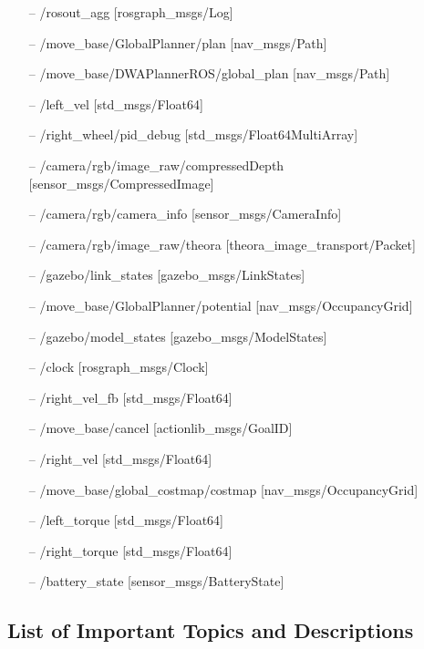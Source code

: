 \documentclass[12]{article}
\begin{document}
\begin{itemize}
\item[--] /rosout\_agg [rosgraph\_msgs/Log]
\item[--] /move\_base/GlobalPlanner/plan [nav\_msgs/Path]
\item[--] /move\_base/DWAPlannerROS/global\_plan [nav\_msgs/Path]
\item[--] /left\_vel [std\_msgs/Float64]
\item[--] /right\_wheel/pid\_debug [std\_msgs/Float64MultiArray]
\item[--] /camera/rgb/image\_raw/compressedDepth [sensor\_msgs/CompressedImage]
\item[--] /camera/rgb/camera\_info [sensor\_msgs/CameraInfo]
\item[--] /camera/rgb/image\_raw/theora [theora\_image\_transport/Packet]
\item[--] /gazebo/link\_states [gazebo\_msgs/LinkStates]
\item[--] /move\_base/GlobalPlanner/potential [nav\_msgs/OccupancyGrid]
\item[--] /gazebo/model\_states [gazebo\_msgs/ModelStates]
\item[--] /clock [rosgraph\_msgs/Clock]
\item[--] /right\_vel\_fb [std\_msgs/Float64]
\item[--] /move\_base/cancel [actionlib\_msgs/GoalID]
\item[--] /right\_vel [std\_msgs/Float64]
\item[--] /move\_base/global\_costmap/costmap [nav\_msgs/OccupancyGrid]
\item[--] /left\_torque [std\_msgs/Float64]
\item[--] /right\_torque [std\_msgs/Float64] 
\item[--] /battery\_state [sensor\_msgs/BatteryState] 
\end{itemize} 

\subsection{List of Important Topics and Descriptions}
\end{document}
